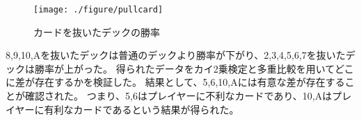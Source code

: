 \begin{figure}[H]
 \begin{center} 
  \texttt{[image: ./figure/pullcard]}
  \caption{カードを抜いたデックの勝率\label{pullcard}}
 \end{center}
\end{figure}

8,9,10,Aを抜いたデックは普通のデックより勝率が下がり、2,3,4,5,6,7を抜いたデックは勝率が上がった。
得られたデータをカイ2乗検定と多重比較を用いてどこに差が存在するかを検証した。
結果として、5,6,10,Aには有意な差が存在することが確認された。
つまり、5,6はプレイヤーに不利なカードであり、10,Aはプレイヤーに有利なカードであるという結果が得られた。

